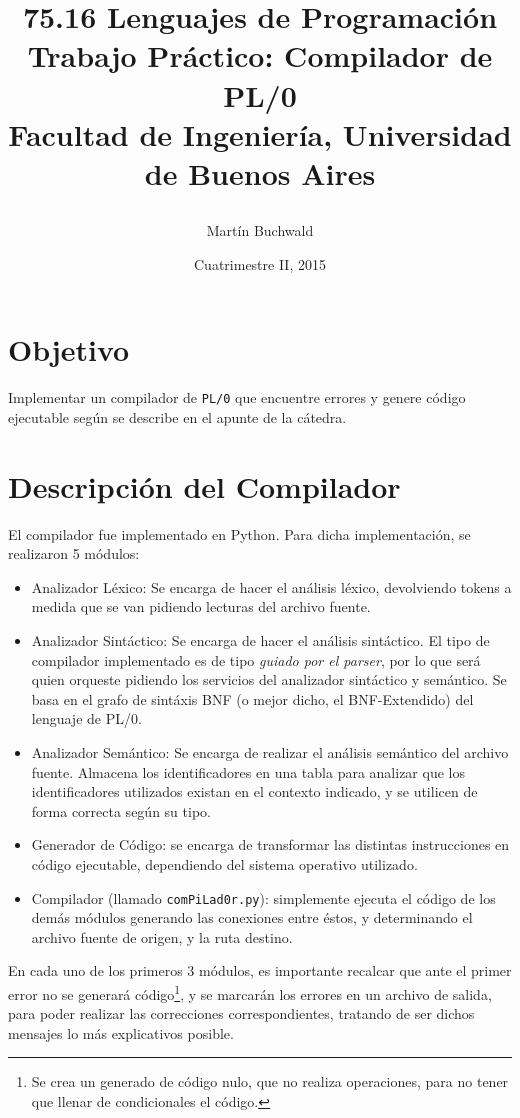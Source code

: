 \documentclass[a4paper,12pt]{article}
\author{Martín Buchwald}
\title{75.16 Lenguajes de Programación\\
	\textbf{Trabajo Práctico: Compilador de PL/0}\\
	Facultad de Ingeniería, Universidad de Buenos Aires
	\date{Cuatrimestre II, 2015}
}
\begin{document}
\maketitle
\thispagestyle{empty}
\newpage
\tableofcontents
\newpage

\section{Objetivo}
Implementar un compilador de \texttt{PL/0} que encuentre errores y genere código ejecutable según se describe en el apunte de la cátedra.

\section{Descripción del Compilador}
El compilador fue implementado en Python\cite{python}. Para dicha implementación, se realizaron 5 módulos:
\begin{itemize}
\item Analizador Léxico: Se encarga de hacer el análisis léxico, devolviendo tokens a medida que se van pidiendo lecturas del archivo fuente. 
\item Analizador Sintáctico: Se encarga de hacer el análisis sintáctico. El tipo de compilador implementado es de tipo \textit{guiado por el parser}, por lo que será quien orqueste pidiendo los servicios del analizador sintáctico y semántico. Se basa en el grafo de sintáxis BNF\cite{bnf} (o mejor dicho, el BNF-Extendido) del lenguaje de PL/0.
\item Analizador Semántico: Se encarga de realizar el análisis semántico del archivo fuente. Almacena los identificadores en una tabla para analizar que los identificadores utilizados existan en el contexto indicado, y se utilicen de forma correcta según su tipo.
\item Generador de Código: se encarga de transformar las distintas instrucciones en código ejecutable, dependiendo del sistema operativo utilizado.
\item Compilador (llamado \texttt{comPiLad0r.py}): simplemente ejecuta el código de los demás módulos generando las conexiones entre éstos, y determinando el archivo fuente de origen, y la ruta destino.
\end{itemize}

En cada uno de los primeros 3 módulos, es importante recalcar que ante el primer error no se generará código\footnote{Se crea un generado de código nulo, que no realiza operaciones, para no tener que llenar de condicionales el código.}, y se marcarán los errores en un archivo de salida, para poder realizar las correcciones correspondientes, tratando de ser dichos mensajes lo más explicativos posible.
\end{document}
